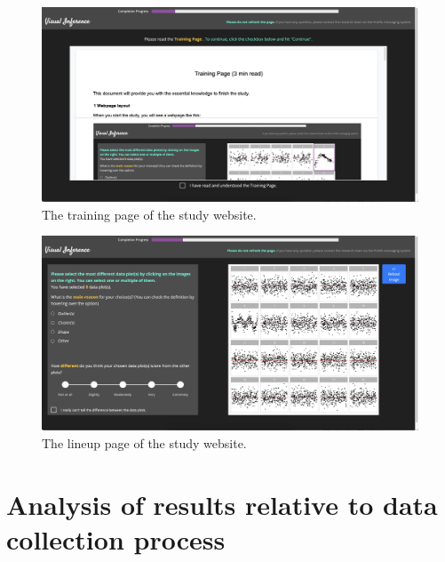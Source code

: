 \documentclass[]{interact}
\theoremstyle{plain}%
\theoremstyle{definition}
\theoremstyle{remark}
\begin{document}
\begin{figure}

{\centering \includegraphics[width=1\linewidth]{figures/training} 

}

\caption{The training page of the study website.}\label{fig:training-page}
\end{figure}

\begin{figure}

{\centering \includegraphics[width=1\linewidth]{figures/lineup1} 

}

\caption{The lineup page of the study website.}\label{fig:lineup-page}
\end{figure}

\newpage

\hypertarget{analysis-of-results-relative-to-data-collection-process}{%
\section{Analysis of results relative to data collection
process}\label{analysis-of-results-relative-to-data-collection-process}}
\end{document}
